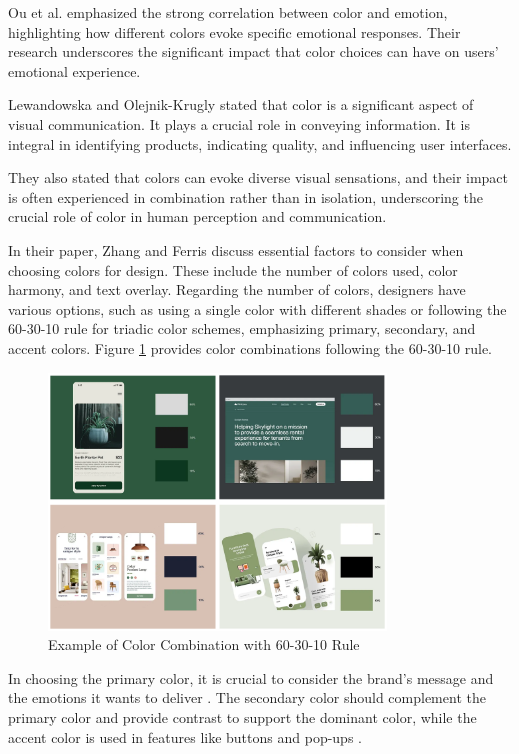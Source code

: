 Ou et al. \cite{Ou04} emphasized the strong correlation between color and emotion, highlighting how different colors evoke specific emotional responses. Their research underscores the significant impact that color choices can have on users' emotional experience.

Lewandowska and Olejnik-Krugly \cite{Lewandowska2021} stated that color is a significant aspect of visual communication. It plays a crucial role in conveying information. It is integral in identifying products, indicating quality, and influencing user interfaces.

They \cite{Lewandowska2021} also stated that colors can evoke diverse visual sensations, and their impact is often experienced in combination rather than in isolation, underscoring the crucial role of color in human perception and communication.

In their paper, Zhang and Ferris \cite{Zhang16} discuss essential factors to consider when choosing colors for design. These include the number of colors used, color harmony, and text overlay. Regarding the number of colors, designers have various options, such as using a single color with different shades or following the 60-30-10 rule for triadic color schemes, emphasizing primary, secondary, and accent colors. Figure \ref{fig:color-scheme} provides color combinations following the 60-30-10 rule.

\begin{figure}[!ht]
    \centering
    \includegraphics[width=0.8\textwidth]{texs/Part2/chapter3/image/colorexample.png}
    \caption{Example of Color Combination with 60-30-10 Rule \cite{M._2023}}
    \label{fig:color-scheme}
\end{figure}

In choosing the primary color, it is crucial to consider the brand's message and the emotions it wants to deliver \cite{M._2023}. The secondary color should complement the primary color and provide contrast to support the dominant color, while the accent color is used in features like buttons and pop-ups  \cite{M._2023}.

